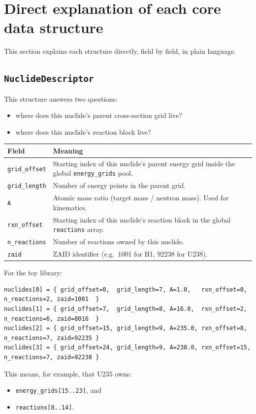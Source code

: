 \documentclass[11pt,a4paper]{article}
\begin{document}
\section{Direct explanation of each core data structure}
This section explains each structure directly, field by field, in plain language.

\subsection{\texttt{NuclideDescriptor}}
This structure answers two questions:
\begin{itemize}[leftmargin=1.4em]
  \item where does this nuclide's parent cross-section grid live?
  \item where does this nuclide's reaction block live?
\end{itemize}

\begin{longtable}{p{2.3cm} p{10.0cm}}
\toprule
Field & Meaning \\
\midrule
\texttt{grid\_offset} & Starting index of this nuclide's parent energy grid inside the global \texttt{energy\_grids} pool. \\
\texttt{grid\_length} & Number of energy points in the parent grid. \\
\texttt{A} & Atomic mass ratio (target mass / neutron mass). Used for kinematics. \\
\texttt{rxn\_offset} & Starting index of this nuclide's reaction block in the global \texttt{reactions} array. \\
\texttt{n\_reactions} & Number of reactions owned by this nuclide. \\
\texttt{zaid} & ZAID identifier (e.g.\ 1001 for H1, 92238 for U238). \\
\bottomrule
\end{longtable}

For the toy library:
\begin{lstlisting}
nuclides[0] = { grid_offset=0,  grid_length=7, A=1.0,   rxn_offset=0,  n_reactions=2, zaid=1001  }
nuclides[1] = { grid_offset=7,  grid_length=8, A=16.0,  rxn_offset=2,  n_reactions=6, zaid=8016  }
nuclides[2] = { grid_offset=15, grid_length=9, A=235.0, rxn_offset=8,  n_reactions=7, zaid=92235 }
nuclides[3] = { grid_offset=24, grid_length=9, A=238.0, rxn_offset=15, n_reactions=7, zaid=92238 }
\end{lstlisting}
This means, for example, that U235 owns:
\begin{itemize}[leftmargin=1.4em]
  \item \texttt{energy\_grids[15..23]}, and
  \item \texttt{reactions[8..14]}.
\end{itemize}
\end{document}
